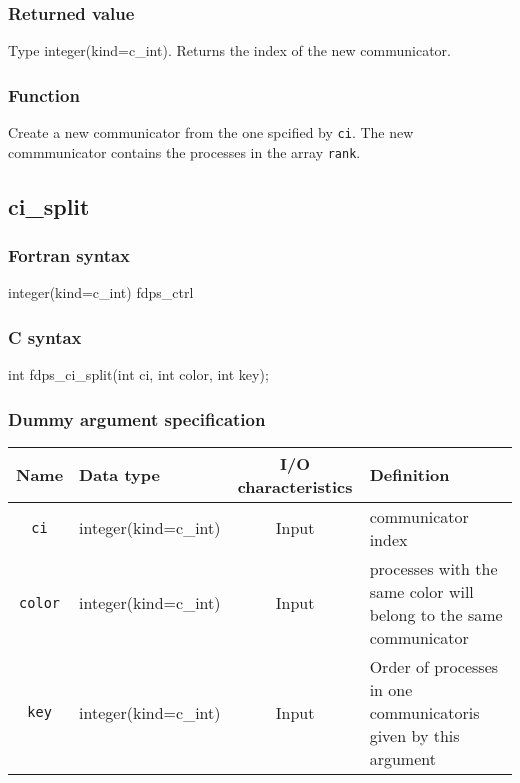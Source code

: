 \subsubsection*{Returned value}
Type integer(kind=c\_int). Returns the index of the new  communicator.

\subsubsection*{Function}

Create a new communicator from the one spcified by {\tt ci}.
The new commmunicator contains the processes in the array {\tt rank}.



\subsection{ci\_split}
\subsubsection*{Fortran syntax}
\begin{screen}
\begin{spverbatim}
integer(kind=c_int) fdps_ctrl%
\end{spverbatim}
\end{screen}

\subsubsection*{C syntax}
\begin{screen}
\begin{spverbatim}
int fdps_ci_split(int ci, int color, int key);
\end{spverbatim}
\end{screen}

\subsubsection*{Dummy argument specification}
\begin{table}[h]
\begin{tabularx}{\linewidth}{cXcX}
\toprule
\rowcolor{Snow2}
Name & Data type & I/O characteristics & Definition \\
\midrule
\verb|ci| & integer(kind=c\_int) & Input & communicator index\\
\verb|color| & integer(kind=c\_int) & Input & processes with the same
color will belong to the same communicator\\
\verb|key| & integer(kind=c\_int) & Input &Order of processes in one
communicatoris given by this argument\\
\bottomrule
\end{tabularx}
\end{table}


